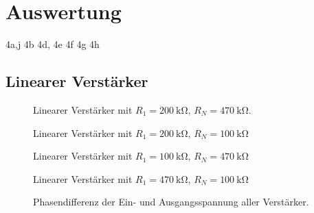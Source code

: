 \section{Auswertung}%
\label{sec:auswertung}
4a,j
4b
4d, 4e
4f
4g
4h
\subsection{Linearer Verst\"arker}

\begin{figure}[ht]
  \centering
  
  \caption{Linearer Verst\"arker mit $R_1 = \SI{200}{\kilo\ohm}$, $R_N = \SI{470}{\kilo\ohm}$.}
  \label{fig:lin_verst_01}
\end{figure}

\begin{figure}[ht]
  \centering
  
  \caption{Linearer Verst\"arker mit $R_1 = \SI{200}{\kilo\ohm}$, $R_N = \SI{100}{\kilo\ohm}$}
  \label{fig:lin_verst_02}
\end{figure}

\begin{figure}[ht]
  \centering
  
  \caption{Linearer Verst\"arker mit $R_1 = \SI{100}{\kilo\ohm}$, $R_N = \SI{470}{\kilo\ohm}$}
  \label{fig:lin_verst_03}
\end{figure}

\begin{figure}[ht]
  \centering
  
  \caption{Linearer Verst\"arker mit $R_1 = \SI{470}{\kilo\ohm}$, $R_N = \SI{100}{\kilo\ohm}$}
  \label{fig:lin_verst_04}
\end{figure}

\begin{figure}[ht]
  \centering
  
  \caption{Phasendifferenz der Ein- und Ausgangsspannung aller Verstärker.}
  \label{fig:phasendiff}
\end{figure}

